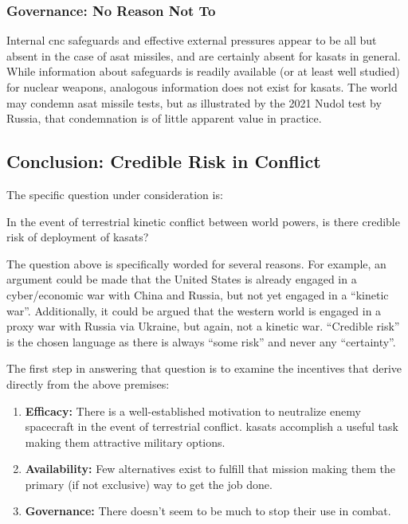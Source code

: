 \subsubsection{Governance: No Reason Not To}
Internal \ac{cnc} safeguards and effective external pressures appear
to be all but absent in the case of \ac{asat} missiles, and are
certainly absent for \acp{kasat} in general.  While information about
safeguards is readily available (or at least well studied) for nuclear
weapons, analogous information does not exist for \acp{kasat}.  The
world may condemn \ac{asat} missile tests, but as illustrated by the
2021 Nudol test by Russia, that condemnation is of little apparent
value in practice.

\subsection{Conclusion: Credible Risk in Conflict}

The specific question under consideration is:

\begin{blockquote}
  In the event of terrestrial kinetic conflict between world powers,
  is there credible risk of deployment of \acfp{kasat}?
\end{blockquote}

The question above is specifically worded for several reasons.  For
example, an argument could be made that the United States is already
engaged in a cyber/economic war with China and Russia, but not yet
engaged in a ``kinetic war''.  Additionally, it could be argued that
the western world is engaged in a proxy war with Russia via Ukraine,
but again, not a kinetic war.  ``Credible risk'' is the chosen
language as there is always ``some risk'' and never any ``certainty''.

The first step in answering that question is to examine the incentives
that derive directly from the above premises:

\begin{enumerate}

\item {\bf Efficacy:} There is a well-established motivation to
  neutralize enemy spacecraft in the event of terrestrial conflict.
  \acfp{kasat} accomplish a useful task making them attractive
  military options.

\item {\bf Availability:} Few alternatives exist to fulfill that
  mission making them the primary (if not exclusive) way to get the
  job done.

\item {\bf Governance:} There doesn't seem to be much to stop their
  use in combat.

\end{enumerate}

